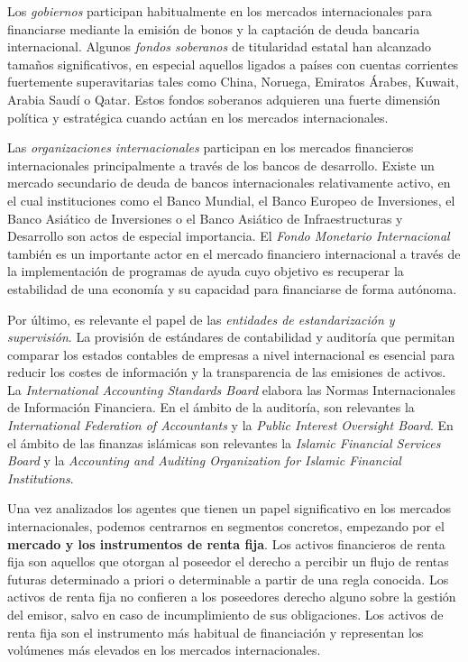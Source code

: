 \documentclass{nuevotema}
\begin{document}
Los \textit{gobiernos} participan habitualmente en los mercados internacionales para financiarse mediante la emisión de bonos y la captación de deuda bancaria internacional. Algunos \textit{fondos soberanos} de titularidad estatal han alcanzado tamaños significativos, en especial aquellos ligados a países con cuentas corrientes fuertemente superavitarias tales como China, Noruega, Emiratos Árabes, Kuwait, Arabia Saudí o Qatar. Estos fondos soberanos adquieren una fuerte dimensión política y estratégica cuando actúan en los mercados internacionales.

Las \textit{organizaciones internacionales} participan en los mercados financieros internacionales principalmente a través de los bancos de desarrollo. Existe un mercado secundario de deuda de bancos internacionales relativamente activo, en el cual instituciones como el Banco Mundial, el Banco Europeo de Inversiones, el Banco Asiático de Inversiones o el Banco Asiático de Infraestructuras y Desarrollo son actos de especial importancia. El \textit{Fondo Monetario Internacional} también es un importante actor en el mercado financiero internacional a través de la implementación de programas de ayuda cuyo objetivo es recuperar la estabilidad de una economía y su capacidad para financiarse de forma autónoma. 

Por último, es relevante el papel de las \textit{entidades de estandarización y supervisión}. La provisión de estándares de contabilidad y auditoría que permitan comparar los estados contables de empresas a nivel internacional es esencial para reducir los costes de información y la transparencia de las emisiones de activos. La \textit{International Accounting Standards Board} elabora las Normas Internacionales de Información Financiera. En el ámbito de la auditoría, son relevantes la \textit{International Federation of Accountants} y la \textit{Public Interest Oversight Board}. En el ámbito de las finanzas islámicas son relevantes la \textit{Islamic Financial Services Board} y la \textit{Accounting and Auditing Organization for Islamic Financial Institutions}.

Una vez analizados los agentes que tienen un papel significativo en los mercados internacionales, podemos centrarnos en segmentos concretos, empezando por el \textbf{mercado y los instrumentos de renta fija}. Los activos financieros de renta fija son aquellos que otorgan al poseedor el derecho a percibir un flujo de rentas futuras determinado a priori o determinable a partir de una regla conocida. Los activos de renta fija no confieren a los poseedores derecho alguno sobre la gestión del emisor, salvo en caso de incumplimiento de sus obligaciones. Los activos de renta fija son el instrumento más habitual de financiación y representan los volúmenes más elevados en los mercados internacionales. 
\end{document}
